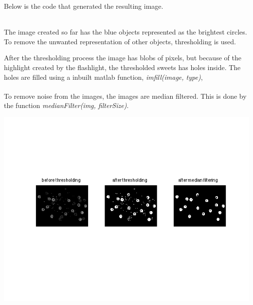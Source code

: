 \mbox{}
Below is the code that generated the resulting image. 

\mbox{}\\
The image created so far has the blue objects represented as the brightest circles. To remove the unwanted representation of other objects, thresholding is used.

After the thresholding process the image has blobs of pixels, but because of the highlight created by the flashlight, the thresholded sweets has holes inside. The holes are filled using a inbuilt matlab function, \emph{imfill(image, type)},
\\

\mbox{}\\
To remove noise from the images, the images are median filtered. This is done by the function \emph{medianFilter(img, filterSize)}. 
\\


\centerline{\includegraphics[clip=true, trim=40 100 40 80]{separate_step3_1.png}}

